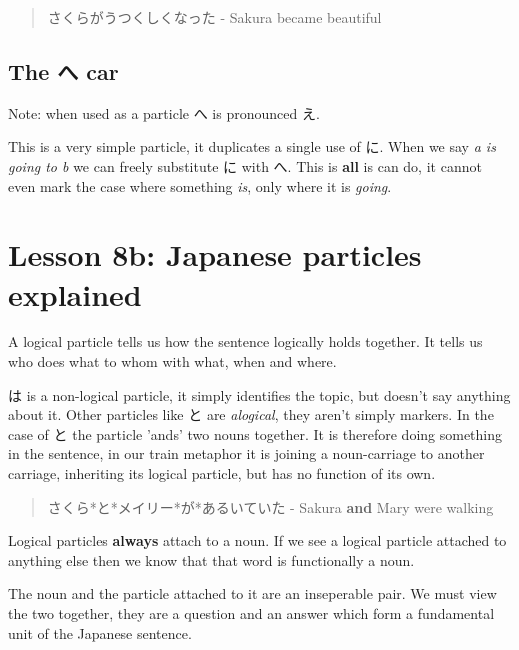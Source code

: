 \documentclass[11pt]{article}
\begin{document}
\begin{quote}
さくらがうつくしくなった - Sakura became beautiful
\end{quote}

\subsection{The へ car}
\label{sec:org4313775}
Note: when used as a particle へ is pronounced え.

This is a very simple particle, it duplicates a single use of に. When we say \emph{a is going to b} we can freely substitute に with へ. This is \textbf{all} is can do, it cannot even mark the case where something \emph{is}, only where it is \emph{going}.
\section{Lesson 8b: Japanese particles explained}
\label{sec:org8fe47fc}
A logical particle tells us how the sentence logically holds together. It tells us who does what to whom with what, when and where.

は is a non-logical particle, it simply identifies the topic, but doesn't say anything about it. Other particles like と are \emph{alogical}, they aren't simply markers. In the case of と the particle 'ands' two nouns together. It is therefore doing something in the sentence, in our train metaphor it is joining a noun-carriage to another carriage, inheriting its logical particle, but has no function of its own.
\begin{quote}
さくら*と*メイリー*が*あるいていた - Sakura \textbf{and} Mary were walking
\end{quote}

Logical particles \textbf{always} attach to a noun. If we see a logical particle attached to anything else then we know that that word is functionally a noun.

The noun and the particle attached to it are an inseperable pair. We must view the two together, they are a question and an answer which form a fundamental unit of the Japanese sentence.
\end{document}
